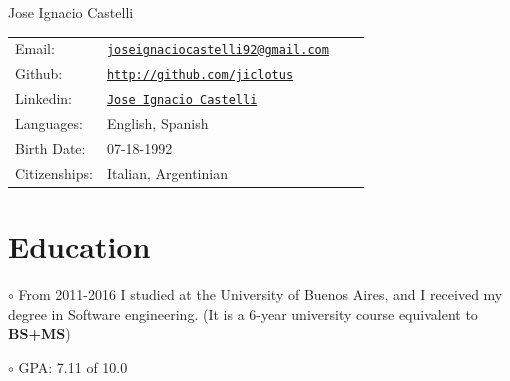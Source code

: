 \documentclass[letterpaper]{article}
\def\name{Jose Ignacio Castelli}
\newenvironment{no-indent-itemize}{
  \begin{list}{}{
    \setlength{\leftmargin}{0em}
  }
}{
  \end{list}
}
\def\bullet{$\circ$\xspace}
\begin{document}
{\huge \name}



\bigskip
\begin{minipage}{0.45\linewidth}
  \begin{tabular}{llll}
    
    
    Email: & \href{mailto:joseignaciocastelli92@gmail.com}{\tt joseignaciocastelli92@gmail.com} \\
     
    
    Github: &\href{http://github.com/jiclotus}{\tt http://github.com/jiclotus}\\
    
    Linkedin: &\href{https://www.linkedin.com/in/jose-ignacio-castelli-138763b0/}{\tt Jose Ignacio Castelli}\\
    
    Languages: & English, Spanish\\
    Birth Date: & \textsc{07-18-1992} \\
    Citizenships: & Italian, Argentinian
    
  \end{tabular}
\end{minipage}


\hfill 
{}


\section*{Education}
\begin{no-indent-itemize}
  \item\bullet From 2011-2016 I studied at the University of Buenos Aires, and I received my degree in Software engineering. (It is a 6-year university course equivalent to \textbf{BS+MS}) 
  \item\bullet GPA: 7.11 of 10.0
\end{no-indent-itemize}
\end{document}
